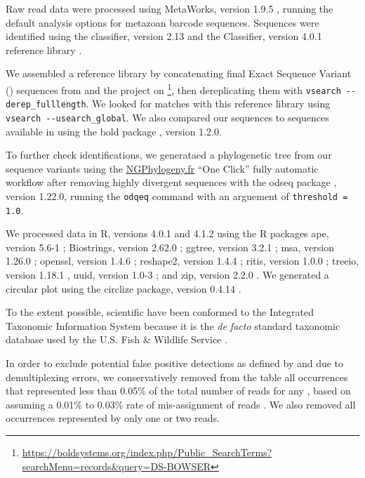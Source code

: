 \begin{multicols}{2}
Raw read data were processed using MetaWorks, version 1.9.5 \citep{PorterHajibabaei2020}, running the default analysis options for metazoan   barcode sequences. Sequences were identified using the  classifier, version 2.13 \citep{Wangetal2007} and the  Classifier, version 4.0.1 reference library \citep{Porter2017, PorterHajibabaei2018}. 

We assembled a reference library by concatenating final Exact Sequence Variant () sequences from \citet{Bowseretal2020, BowserBowser2020} and the  project on \footnote{\url{https://boldsystems.org/index.php/Public_SearchTerms?searchMenu=records&query=DS-BOWSER}}, then dereplicating them with \verb|vsearch --derep_fulllength|. We looked for matches with this reference library using \verb|vsearch --usearch_global|. We also compared our sequences to sequences available in  using the bold package \citep{Chamberlain2021}, version 1.2.0.

To further check identifications, we generataed a phylogenetic tree from our sequence variants using the \href{https://ngphylogeny.fr/}{NGPhylogeny.fr} ``One Click'' fully automatic workflow \citep{CriscuoloGribaldo2010,
DesperGascuel2002,
Lefortetal2015,
Lemoineetal2018,
KatohStandley2013,
JunierZdobnov2010} after removing highly divergent sequences with the odseq package \citep{Jimenez2021}, version 1.22.0, running the \verb|odqeq| command with an arguement of \verb|threshold = 1.0|.

We processed data in R, versions 4.0.1 and 4.1.2 \citep{RCoreTeam2021} using the R packages ape, version 5.6-1 \citep{ParadisSchliep2019}; Biostrings, version 2.62.0 \citep{Pagesetal2021}; ggtree, version 3.2.1 \citep{Yuetal2017, Yuetal2018, Yu2020}; msa, version 1.26.0 \citep{Bodenhoferetal2015}; openssl, version 1.4.6 \citep{Ooms2021}; reshape2, version 1.4.4 \citep{Wickham2007}; ritis, version 1.0.0 \citep{Chamberlain2021b}; treeio, version 1.18.1 \citep{Wangetal2020}, uuid, version 1.0-3 \citep{UrbanekTso2021}; and zip, version 2.2.0 \citep{Csardietal2021}. We generated a circular plot using the circlize package, version 0.4.14 \citep{Guetal2014}.

To the extent possible, scientific have been conformed to the Integrated Taxonomic Information System \citep{ITIS2021} because it is the \textit{de facto} standard taxonomic database used by the U.S. Fish \& Wildlife Service \citep[e.g.,][]{NRPC2014, NRPC2019}.

In order to exclude potential false positive detections as defined by \citet{Mackenzieetal2002} and \citet{Mackenzieetal2006} due to demultiplexing errors, we conservatively removed from the  table all occurrences that represented less than 0.05\% of the total number of reads for any , based on assuming a 0.01\% to 0.03\% rate of mis-assignment of reads \citep{Deineretal2017}. We also removed all occurrences represented by only one or two reads.


\end{multicols}
